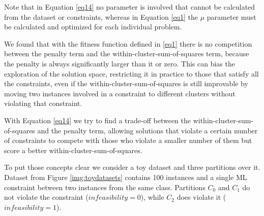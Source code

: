 \documentclass[review]{elsarticle}
\begin{document}
Note that in Equation \eqref{eq14} no parameter is involved that cannot be calculated from the dataset or constraints, whereas in Equation \eqref{eq1} the $\mu$ parameter must be calculated and optimized for each individual problem.

We found that with the fitness function defined in \eqref{eq1} there is no competition between the penalty term and the within-cluster-sum-of-squares term, because the penalty is always significantly larger than it or zero. This can bias the exploration of the solution space, restricting it in practice to those that satisfy all the constraints, even if the within-cluster-sum-of-squares is still improvable by moving two instances involved in a constraint to different clusters without violating that constraint.

With Equation \eqref{eq14} we try to find a trade-off between the within-cluster-sum-of-squares and the penalty term, allowing solutions that violate a certain number of constraints to compete with those who violate a smaller number of them but score a better within-cluster-sum-of-squares.

To put those concepts clear we consider a toy dataset and three partitions over it. Dataset from Figure \ref{img:toydatasets} contains 100 instances and a single ML constraint between two instances from the same class. Partitions $C_0$ and $C_1$ do not violate the constraint ($infeasibility = 0$), while $C_2$ does violate it ($infeasibility = 1$). 
\end{document}
